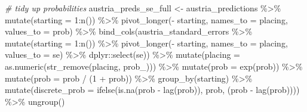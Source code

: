 \documentclass[
]{book}
\newenvironment{Shaded}{\begin{snugshade}}{\end{snugshade}}
\newcommand{\AttributeTok}[1]{\textcolor[rgb]{0.77,0.63,0.00}{#1}}
\newcommand{\CommentTok}[1]{\textcolor[rgb]{0.56,0.35,0.01}{\textit{#1}}}
\newcommand{\DecValTok}[1]{\textcolor[rgb]{0.00,0.00,0.81}{#1}}
\newcommand{\FunctionTok}[1]{\textcolor[rgb]{0.00,0.00,0.00}{#1}}
\newcommand{\NormalTok}[1]{#1}
\newcommand{\OtherTok}[1]{\textcolor[rgb]{0.56,0.35,0.01}{#1}}
\newcommand{\SpecialCharTok}[1]{\textcolor[rgb]{0.00,0.00,0.00}{#1}}
\newcommand{\StringTok}[1]{\textcolor[rgb]{0.31,0.60,0.02}{#1}}
\begin{document}
\begin{Shaded}
\begin{Highlighting}[]
\CommentTok{\# tidy up probabilities}
\NormalTok{austria\_preds\_se\_full }\OtherTok{\textless{}{-}}\NormalTok{ austria\_predictions }\SpecialCharTok{\%\textgreater{}\%}
  \FunctionTok{mutate}\NormalTok{(}\AttributeTok{starting =} \DecValTok{1}\SpecialCharTok{:}\FunctionTok{n}\NormalTok{()) }\SpecialCharTok{\%\textgreater{}\%}
  \FunctionTok{pivot\_longer}\NormalTok{(}\SpecialCharTok{{-}}\NormalTok{ starting, }\AttributeTok{names\_to =} \StringTok{\textquotesingle{}placing\textquotesingle{}}\NormalTok{, }\AttributeTok{values\_to =} \StringTok{\textquotesingle{}prob\textquotesingle{}}\NormalTok{) }\SpecialCharTok{\%\textgreater{}\%} 
  \FunctionTok{bind\_cols}\NormalTok{(austria\_standard\_errors }\SpecialCharTok{\%\textgreater{}\%} \FunctionTok{mutate}\NormalTok{(}\AttributeTok{starting =} \DecValTok{1}\SpecialCharTok{:}\FunctionTok{n}\NormalTok{()) }\SpecialCharTok{\%\textgreater{}\%}
  \FunctionTok{pivot\_longer}\NormalTok{(}\SpecialCharTok{{-}}\NormalTok{ starting, }\AttributeTok{names\_to =} \StringTok{\textquotesingle{}placing\textquotesingle{}}\NormalTok{, }\AttributeTok{values\_to =} \StringTok{\textquotesingle{}se\textquotesingle{}}\NormalTok{) }\SpecialCharTok{\%\textgreater{}\%}
\NormalTok{    dplyr}\SpecialCharTok{::}\FunctionTok{select}\NormalTok{(se)) }\SpecialCharTok{\%\textgreater{}\%}
  \FunctionTok{mutate}\NormalTok{(}\AttributeTok{placing =} \FunctionTok{as.numeric}\NormalTok{(}\FunctionTok{str\_remove}\NormalTok{(placing, }\StringTok{\textquotesingle{}prob\_\textquotesingle{}}\NormalTok{))) }\SpecialCharTok{\%\textgreater{}\%}
  \FunctionTok{mutate}\NormalTok{(}\AttributeTok{prob =} \FunctionTok{exp}\NormalTok{(prob)) }\SpecialCharTok{\%\textgreater{}\%}
  \FunctionTok{mutate}\NormalTok{(}\AttributeTok{prob =}\NormalTok{ prob }\SpecialCharTok{/}\NormalTok{ (}\DecValTok{1} \SpecialCharTok{+}\NormalTok{ prob)) }\SpecialCharTok{\%\textgreater{}\%}
  \FunctionTok{group\_by}\NormalTok{(starting) }\SpecialCharTok{\%\textgreater{}\%} 
  \FunctionTok{mutate}\NormalTok{(}\AttributeTok{discrete\_prob =} \FunctionTok{ifelse}\NormalTok{(}\FunctionTok{is.na}\NormalTok{(prob }\SpecialCharTok{{-}} \FunctionTok{lag}\NormalTok{(prob)), prob, (prob }\SpecialCharTok{{-}} \FunctionTok{lag}\NormalTok{(prob)))) }\SpecialCharTok{\%\textgreater{}\%}
  \FunctionTok{ungroup}\NormalTok{()}


\end{Highlighting}
\end{Shaded}
\end{document}
